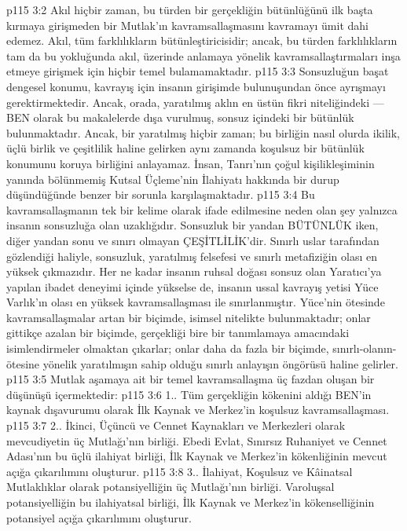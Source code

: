 \vs p115 3:2 Akıl hiçbir zaman, bu türden bir gerçekliğin bütünlüğünü ilk başta kırmaya girişmeden bir Mutlak’ın kavramsallaşmasını kavramayı ümit dahi edemez. Akıl, tüm farklılıkların bütünleştiricisidir; ancak, bu türden farklılıkların tam da bu yokluğunda akıl, üzerinde anlamaya yönelik kavramsallaştırmaları inşa etmeye girişmek için hiçbir temel bulamamaktadır.
\vs p115 3:3 Sonsuzluğun başat dengesel konumu, kavrayış için insanın girişimde bulunuşundan önce ayrışmayı gerektirmektedir. Ancak, orada, yaratılmış aklın en üstün fikri niteliğindeki --- BEN olarak bu makalelerde dışa vurulmuş, sonsuz içindeki bir bütünlük bulunmaktadır. Ancak, bir yaratılmış hiçbir zaman; bu birliğin nasıl olurda ikilik, üçlü birlik ve çeşitlilik haline gelirken aynı zamanda koşulsuz bir bütünlük konumunu koruya birliğini anlayamaz. İnsan, Tanrı’nın çoğul kişilikleşiminin yanında bölünmemiş Kutsal Üçleme’nin İlahiyatı hakkında bir durup düşündüğünde benzer bir sorunla karşılaşmaktadır.
\vs p115 3:4 Bu kavramsallaşmanın tek bir kelime olarak ifade edilmesine neden olan şey yalnızca insanın sonsuzluğa olan uzaklığıdır. Sonsuzluk bir yandan BÜTÜNLÜK iken, diğer yandan sonu ve sınırı olmayan ÇEŞİTLİLİK’dir. Sınırlı uslar tarafından gözlendiği haliyle, sonsuzluk, yaratılmış felsefesi ve sınırlı metafiziğin olası en yüksek çıkmazıdır. Her ne kadar insanın ruhsal doğası sonsuz olan Yaratıcı’ya yapılan ibadet deneyimi içinde yükselse de, insanın ussal kavrayış yetisi Yüce Varlık’ın olası en yüksek kavramsallaşması ile sınırlanmıştır. Yüce’nin ötesinde kavramsallaşmalar artan bir biçimde, isimsel nitelikte bulunmaktadır; onlar gittikçe azalan bir biçimde, gerçekliği bire bir tanımlamaya amacındaki isimlendirmeler olmaktan çıkarlar; onlar daha da fazla bir biçimde, sınırlı\hyp{}olanın\hyp{}ötesine yönelik yaratılmışın sahip olduğu sınırlı anlayışın öngörüsü haline gelirler.
\vs p115 3:5 Mutlak aşamaya ait bir temel kavramsallaşma üç fazdan oluşan bir düşünüşü içermektedir:
\vs p115 3:6 1.\bibnobreakspace {}. Tüm gerçekliğin kökenini aldığı BEN’in kaynak dışavurumu olarak İlk Kaynak ve Merkez’in koşulsuz kavramsallaşması.
\vs p115 3:7 2.\bibnobreakspace {}. İkinci, Üçüncü ve Cennet Kaynakları ve Merkezleri olarak mevcudiyetin üç Mutlağı’nın birliği. Ebedi Evlat, Sınırsız Ruhaniyet ve Cennet Adası’nın bu üçlü ilahiyat birliği, İlk Kaynak ve Merkez’in kökenliğinin mevcut açığa çıkarılımını oluşturur.
\vs p115 3:8 3.\bibnobreakspace {}. İlahiyat, Koşulsuz ve Kâinatsal Mutlaklıklar olarak potansiyelliğin üç Mutlağı’nın birliği. Varoluşsal potansiyelliğin bu ilahiyatsal birliği, İlk Kaynak ve Merkez’in kökenselliğinin potansiyel açığa çıkarılımını oluşturur.
